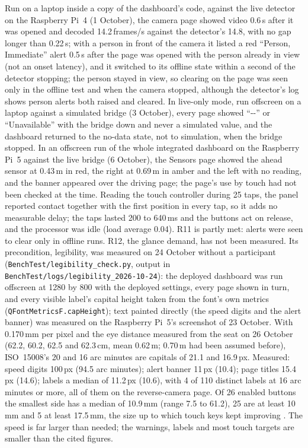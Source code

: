 Run on a laptop inside a copy of the dashboard's code, against the live detector on the Raspberry Pi~4 (1 October), the camera page showed video 0.6\,s after it was opened and decoded 14.2\,frames/s against the detector's 14.8, with no gap longer than 0.22\,s; with a person in front of the camera it listed a red ``Person, Immediate'' alert 0.5\,s after the page was opened with the person already in view (not an onset latency), and it switched to its offline state within a second of the detector stopping; the person stayed in view, so clearing on the page was seen only in the offline test and when the camera stopped, although the detector's log shows person alerts both raised and cleared. In live-only mode, run offscreen on a laptop against a simulated bridge (3 October), every page showed ``-{}-'' or ``Unavailable'' with the bridge down and never a simulated value, and the dashboard returned to the no-data state, not to simulation, when the bridge stopped. In an offscreen run of the whole integrated dashboard on the Raspberry Pi~5 against the live bridge (6 October), the Sensors page showed the ahead sensor at 0.43\,m in red, the right at 0.69\,m in amber and the left with no reading, and the banner appeared over the driving page; the page's use by touch had not been checked at the time. Reading the touch controller during 25 taps, the panel reported contact together with the first position in every tap, so it adds no measurable delay; the taps lasted 200 to 640\,ms and the buttons act on release, and the processor was idle (load average 0.04). R11 is partly met: alerts were seen to clear only in offline runs. R12, the glance demand, has not been measured. Its precondition, legibility, was measured on 24 October without a participant (\texttt{BenchTest/\allowbreak{}legibility\_check.py}, output in \texttt{BenchTest/\allowbreak{}logs/\allowbreak{}legibility\_2026-10-24}): the deployed dashboard was run offscreen at 1280 by 800 with the deployed settings, every page shown in turn, and every visible label's capital height taken from the font's own metrics (\texttt{QFontMetricsF.capHeight}); text painted directly (the speed digits and the alert banner) was measured on the Raspberry Pi~5's screenshot of 23 October. With 0.170\,mm per pixel and the eye distance measured from the seat on 26 October (62.2, 60.2, 62.5 and 62.3\,cm, mean 0.62\,m; 0.70\,m had been assumed before), ISO~15008's 20 and 16 arc minutes are capitals of 21.1 and 16.9\,px. Measured: speed digits 100\,px (94.5 arc minutes); alert banner 11\,px (10.4); page titles 15.4\,px (14.6); labels a median of 11.2\,px (10.6), with 4 of 110 distinct labels at 16 arc minutes or more, all of them on the reverse-camera page. Of 26 enabled buttons the smallest side has a median of 10.9\,mm (range 7.5 to 61.2), 25 are at least 10\,mm and 5 at least 17.5\,mm, the size up to which touch keys kept improving \cite{kim2014touchkey}. The speed is far larger than needed; the warnings, labels and most touch targets are smaller than the cited figures.

